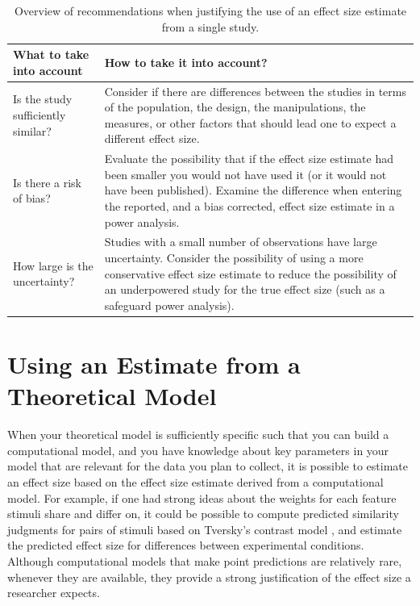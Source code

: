\documentclass[
  oneside]{krantz}
\begin{document}
\begin{table}

\caption{\label{tab:table-es-just}Overview of recommendations when justifying the use of an effect size estimate from a single study.}
\centering
\begin{tabular}[t]{>{\raggedright\arraybackslash}p{5cm}|>{\raggedright\arraybackslash}p{10cm}}
\hline
What to take into account & How to take it into account?\\
\hline
Is the study sufficiently similar? & Consider if there are differences between the studies in terms of the population, the design, the manipulations, the measures, or other factors that should lead one to expect a different effect size.\\
\hline
Is there a risk of bias? & Evaluate the possibility that if the effect size estimate had been smaller you would not have used it (or it would not have been published). Examine the difference when entering the reported, and a bias corrected, effect size estimate in a power analysis.\\
\hline
How large is the uncertainty? & Studies with a small number of observations have large uncertainty. Consider the possibility of using a more conservative effect size estimate to reduce the possibility of an underpowered study for the true effect size (such as a safeguard power analysis).\\
\hline
\end{tabular}
\end{table}

\hypertarget{using-an-estimate-from-a-theoretical-model}{%
\section{Using an Estimate from a Theoretical Model}\label{using-an-estimate-from-a-theoretical-model}}

When your theoretical model is sufficiently specific such that you can build a computational model, and you have knowledge about key parameters in your model that are relevant for the data you plan to collect, it is possible to estimate an effect size based on the effect size estimate derived from a computational model. For example, if one had strong ideas about the weights for each feature stimuli share and differ on, it could be possible to compute predicted similarity judgments for pairs of stimuli based on Tversky's contrast model \citep{tversky_features_1977}, and estimate the predicted effect size for differences between experimental conditions. Although computational models that make point predictions are relatively rare, whenever they are available, they provide a strong justification of the effect size a researcher expects.
\end{document}
